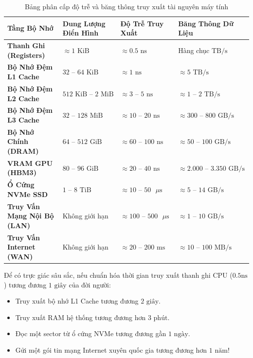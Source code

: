 \begin{table}[htbp]
\centering
\small
\setlength{\tabcolsep}{6pt}
\begin{tabular}{p{}p{}p{}p{}}
\toprule
\textbf{Tầng Bộ Nhớ} & \textbf{Dung Lượng Điển Hình} & \textbf{Độ Trễ Truy Xuất} & \textbf{Băng Thông Dữ Liệu} \\
\midrule
\textbf{Thanh Ghi (Registers)} & $\approx 1\text{ KiB}$ & $\approx 0.5\text{ ns}$ & Hàng chục $\text{TB/s}$ \\
\textbf{Bộ Nhớ Đệm L1 Cache} & $32\text{ -- }64\text{ KiB}$ & $\approx 1\text{ ns}$ & $\approx 5\text{ TB/s}$ \\
\textbf{Bộ Nhớ Đệm L2 Cache} & $512\text{ KiB -- }2\text{ MiB}$ & $\approx 3\text{ -- }5\text{ ns}$ & $\approx 1\text{ -- }2\text{ TB/s}$ \\
\textbf{Bộ Nhớ Đệm L3 Cache} & $32\text{ -- }128\text{ MiB}$ & $\approx 10\text{ -- }20\text{ ns}$ & $\approx 300\text{ -- }800\text{ GB/s}$ \\
\textbf{Bộ Nhớ Chính (DRAM)} & $64\text{ -- }512\text{ GiB}$ & $\approx 60\text{ -- }100\text{ ns}$ & $\approx 50\text{ -- }100\text{ GB/s}$ \\
\textbf{VRAM GPU (HBM3)} & $80\text{ -- }96\text{ GiB}$ & $\approx 20\text{ -- }40\text{ ns}$ & $\approx 2.000\text{ -- }3.350\text{ GB/s}$ \\
\textbf{Ổ Cứng NVMe SSD} & $1\text{ -- }8\text{ TiB}$ & $\approx 10\text{ -- }50\text{ }\mu\text{s}$ & $\approx 5\text{ -- }14\text{ GB/s}$ \\
\textbf{Truy Vấn Mạng Nội Bộ (LAN)} & Không giới hạn & $\approx 100\text{ -- }500\text{ }\mu\text{s}$ & $\approx 1\text{ -- }10\text{ GB/s}$ \\
\textbf{Truy Vấn Internet (WAN)} & Không giới hạn & $\approx 20\text{ -- }200\text{ ms}$ & $\approx 10\text{ -- }100\text{ MB/s}$ \\
\bottomrule
\end{tabular}
\caption{Bảng phân cấp độ trễ và băng thông truy xuất tài nguyên máy tính}
\label{tbl:latency-numbers}
\end{table}

Để có trực giác sâu sắc, nếu chuẩn hóa thời gian truy xuất thanh ghi CPU ($0.5\text{ns}$) tương đương $1\text{ giây}$ của đời người:
\begin{itemize}
  \item Truy xuất bộ nhớ L1 Cache tương đương $2\text{ giây}$.
  \item Truy xuất RAM hệ thống tương đương hơn $3\text{ phút}$.
  \item Đọc một sector từ ổ cứng NVMe tương đương gần $1\text{ ngày}$.
  \item Gửi một gói tin mạng Internet xuyên quốc gia tương đương hơn $1\text{ năm}$!
\end{itemize}

